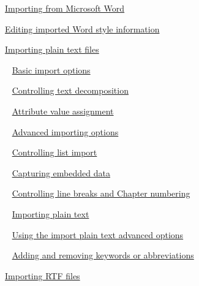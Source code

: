 \documentclass[11pt,a4paper]{article}
\begin{document}
\href{https://www.ibm.com/support/knowledgecenter/search/Importing%20from%20Microsoft%20Word?scope=SSYQBZ_9.6.1}{Importing from Microsoft Word}

\href{https://www.ibm.com/support/knowledgecenter/search/Editing%20imported%20Word%20style%20information?scope=SSYQBZ_9.6.1}{Editing imported Word style information}

\href{https://www.ibm.com/support/knowledgecenter/search/Importing%20plain%20text%20files?scope=SSYQBZ_9.6.1}{Importing plain text files}

\,\,\, \href{https://www.ibm.com/support/knowledgecenter/search/Basic%20import%20options?scope=SSYQBZ_9.6.1}{Basic import options}

\,\,\, \href{https://www.ibm.com/support/knowledgecenter/search/Controlling%20text%20decomposition?scope=SSYQBZ_9.6.1}{Controlling text decomposition}

\,\,\, \href{https://www.ibm.com/support/knowledgecenter/search/Attribute%20value%20assignment?scope=SSYQBZ_9.6.1}{Attribute value assignment}

\,\,\, \href{https://www.ibm.com/support/knowledgecenter/search/Advanced%20importing%20options?scope=SSYQBZ_9.6.1}{Advanced importing options}

\,\,\, \href{https://www.ibm.com/support/knowledgecenter/search/Controlling%20list%20import?scope=SSYQBZ_9.6.1}{Controlling list import}

\,\,\, \href{https://www.ibm.com/support/knowledgecenter/search/Capturing%20embedded%20data?scope=SSYQBZ_9.6.1}{Capturing embedded data}

\,\,\, \href{https://www.ibm.com/support/knowledgecenter/search/Controlling%20line%20breaks%20and%20Chapter%20numbering?scope=SSYQBZ_9.6.1}{Controlling line breaks and Chapter numbering}

\,\,\, \href{https://www.ibm.com/support/knowledgecenter/search/Importing%20plain%20text?scope=SSYQBZ_9.6.1}{Importing plain text}

\,\,\, \href{https://www.ibm.com/support/knowledgecenter/search/Using%20the%20import%20plain%20text%20advanced%20options?scope=SSYQBZ_9.6.1}{Using the import plain text advanced options}

\,\,\, \href{https://www.ibm.com/support/knowledgecenter/search/Adding%20and%20removing%20keywords%20or%20abbreviations?scope=SSYQBZ_9.6.1}{Adding and removing keywords or abbreviations}

\href{https://www.ibm.com/support/knowledgecenter/search/Importing%20RTF%20files?scope=SSYQBZ_9.6.1}{Importing RTF files}
\end{document}
